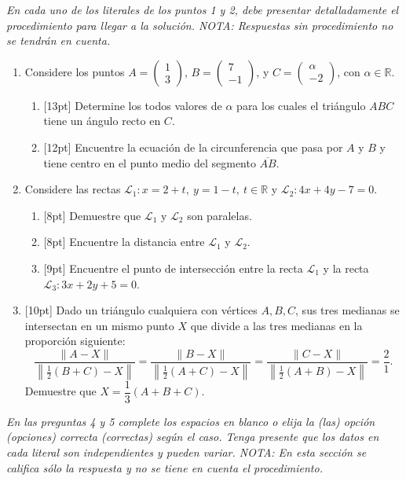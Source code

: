 \documentclass[11pt]{article}
\newcommand{\vect}[2]{\begin{pmatrix}#1\\#2\end{pmatrix}}
\newcommand{\nota}[1]{{\small\itshape\color{unalblue!70!black} #1}}
\begin{document}
\vspace{6pt}
\nota{En cada uno de los literales de los puntos 1 y 2, debe presentar detalladamente el procedimiento para llegar a la solución. NOTA: Respuestas sin procedimiento no se tendrán en cuenta.}

\begin{enumerate}
\item Considere los puntos $A=\vect{1}{3}$, $B=\vect{7}{-1}$, y $C=\vect{\alpha}{-2}$, con $\alpha\in\mathbb{R}$.

\begin{enumerate}[label=(\alph*)]
\item{}[13pt] Determine los todos valores de $\alpha$ para los cuales el triángulo $ABC$ tiene un ángulo recto en $C$.
\item{}[12pt] Encuentre la ecuación de la circunferencia que pasa por $A$ y $B$ y tiene centro en el punto medio del segmento $\overline{AB}$.
\end{enumerate}

\item Considere las rectas $\mathcal{L}_1: x=2+t,\ y=1-t,\ t\in\mathbb{R}$ y $\mathcal{L}_2: 4x+4y-7=0$.

\begin{enumerate}[label=(\alph*)]
\item{}[8pt] Demuestre que $\mathcal{L}_1$ y $\mathcal{L}_2$ son paralelas.
\item{}[8pt] Encuentre la distancia entre $\mathcal{L}_1$ y $\mathcal{L}_2$.
\item{}[9pt] Encuentre el punto de intersección entre la recta $\mathcal{L}_1$ y la recta $\mathcal{L}_3: 3x+2y+5=0$.
\end{enumerate}

\item{}[10pt] Dado un triángulo cualquiera con vértices $A,B,C$, sus tres medianas se intersectan en un mismo punto $X$ que divide a las tres medianas en la proporción siguiente:
\begin{equation}
\frac{\|A-X\|}{\left\|\frac{1}{2}(B+C)-X\right\|}=\frac{\|B-X\|}{\left\|\frac{1}{2}(A+C)-X\right\|}=\frac{\|C-X\|}{\left\|\frac{1}{2}(A+B)-X\right\|}=\frac{2}{1}.
\end{equation}
Demuestre que $X=\dfrac{1}{3}(A+B+C)$.
\end{enumerate}

\vspace{6pt}
\nota{En las preguntas 4 y 5 complete los espacios en blanco o elija la (las) opción (opciones) correcta (correctas) según el caso. Tenga presente que los datos en cada literal son independientes y pueden variar. NOTA: En esta sección se califica sólo la respuesta y no se tiene en cuenta el procedimiento.}
\end{document}
